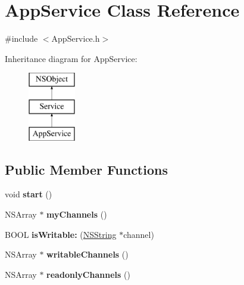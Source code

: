 \hypertarget{interface_app_service}{
\section{\-App\-Service \-Class \-Reference}
\label{interface_app_service}
}


{\ttfamily \#include $<$\-App\-Service.\-h$>$}

\-Inheritance diagram for \-App\-Service\-:\begin{figure}[H]
\begin{center}
\leavevmode
\includegraphics[height=3.000000cm]{interface_app_service}
\end{center}
\end{figure}
\subsection*{\-Public \-Member \-Functions}
\begin{DoxyCompactItemize}
\item 
\hypertarget{interface_app_service_a71f0c097ee01e8afdc13e820d8a8ea7f}{
void {\bfseries start} ()}
\label{interface_app_service_a71f0c097ee01e8afdc13e820d8a8ea7f}

\item 
\hypertarget{interface_app_service_a9ce3794d2f9b975481adf72bc242ce2d}{
\-N\-S\-Array $\ast$ {\bfseries my\-Channels} ()}
\label{interface_app_service_a9ce3794d2f9b975481adf72bc242ce2d}

\item 
\hypertarget{interface_app_service_afc426d0de90cf7f57f70b894bee9561f}{
\-B\-O\-O\-L {\bfseries is\-Writable\-:} (\hyperlink{class_n_s_string}{\-N\-S\-String} $\ast$channel)}
\label{interface_app_service_afc426d0de90cf7f57f70b894bee9561f}

\item 
\hypertarget{interface_app_service_a69183a39f78572e50f7335985e2fe8b1}{
\-N\-S\-Array $\ast$ {\bfseries writable\-Channels} ()}
\label{interface_app_service_a69183a39f78572e50f7335985e2fe8b1}

\item 
\hypertarget{interface_app_service_a681cc94191f25cb2d7144a2176bb85a5}{
\-N\-S\-Array $\ast$ {\bfseries readonly\-Channels} ()}
\label{interface_app_service_a681cc94191f25cb2d7144a2176bb85a5}

\end{DoxyCompactItemize}

